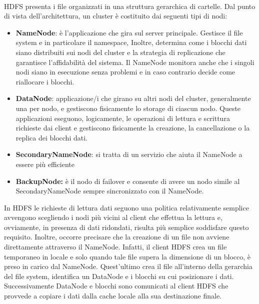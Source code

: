 \\HDFS presenta i file organizzati in una struttura gerarchica di cartelle. Dal punto di vista dell'architettura, un cluster è costituito dai seguenti tipi di nodi: 
\begin{itemize}
\item  \textbf{NameNode}: è l'applicazione che gira sul server principale. Gestisce il file system e in particolare il namespace, Inoltre, determina come i blocchi dati siano distribuiti sui nodi del cluster e la strategia di replicazione che garantisce l’affidabilità del sistema. Il NameNode monitora anche che i singoli nodi siano in esecuzione senza problemi e in caso contrario decide come riallocare i blocchi. 
\item  \textbf{DataNode}: applicazione/i che girano su altri nodi del cluster, generalmente una per nodo, e gestiscono fisicamente lo storage di ciascun nodo. Queste applicazioni eseguono, logicamente, le operazioni di lettura e scrittura richieste dai client e gestiscono fisicamente la creazione, la cancellazione o la replica dei blocchi dati. 
\item  \textbf{SecondaryNameNode}: si tratta di un servizio che aiuta il NameNode a essere più efficiente 
\item  \textbf{BackupNode:} è il nodo di failover e consente di avere un nodo simile al SecondaryNameNode sempre sincronizzato con il NameNode.
\end{itemize}
In HDFS le richieste di lettura dati seguono una politica relativamente semplice \cite{hadoop:HDFS} avvengono scegliendo i nodi più vicini al client che effettua la lettura e, ovviamente, in presenza di dati ridondati, risulta più semplice soddisfare questo requisito. Inoltre, occorre precisare che la creazione di un file non avviene direttamente attraverso il NameNode. Infatti, il client HDFS crea un file temporaneo in locale e solo quando tale file supera la dimensione di un blocco, è preso in carico dal NameNode. Quest’ultimo crea il file all’interno della gerarchia del file system, identifica un DataNode e i blocchi su cui posizionare i dati. Successivamente DataNode e blocchi sono comunicati al client HDFS che provvede a copiare i dati dalla cache locale alla sua destinazione finale.
